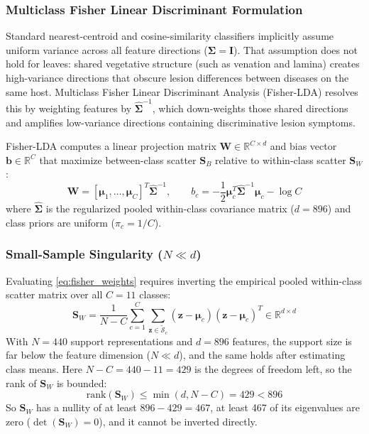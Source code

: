 \documentclass[preprint,12pt]{elsarticle}
\begin{document}
\subsubsection{Multiclass Fisher Linear Discriminant Formulation}
Standard nearest-centroid and cosine-similarity classifiers implicitly assume uniform variance across all feature directions ($\mathbf{\Sigma} = \mathbf{I}$). That assumption does not hold for leaves: shared vegetative structure (such as venation and lamina) creates high-variance directions that obscure lesion differences between diseases on the same host. Multiclass Fisher Linear Discriminant Analysis (Fisher-LDA) \cite{fisher1936use, rao1948utilization} resolves this by weighting features by $\hat{\mathbf{\Sigma}}^{-1}$, which down-weights those shared directions and amplifies low-variance directions containing discriminative lesion symptoms.

Fisher-LDA computes a linear projection matrix $\mathbf{W} \in \mathbb{R}^{C \times d}$ and bias vector $\mathbf{b} \in \mathbb{R}^C$ that maximize between-class scatter $\mathbf{S}_B$ relative to within-class scatter $\mathbf{S}_W$:
\begin{equation}
    \label{eq:fisher_weights}
    \mathbf{W} = [\boldsymbol{\mu}_1, \dots, \boldsymbol{\mu}_C]^T \hat{\mathbf{\Sigma}}^{-1}, \qquad
    b_c = -\frac{1}{2}\boldsymbol{\mu}_c^T \hat{\mathbf{\Sigma}}^{-1}\boldsymbol{\mu}_c - \log C
\end{equation}
where $\hat{\mathbf{\Sigma}}$ is the regularized pooled within-class covariance matrix ($d = 896$) and class priors are uniform ($\pi_c = 1/C$).

\subsubsection{Small-Sample Singularity ($N \ll d$)}
Evaluating \eqref{eq:fisher_weights} requires inverting the empirical pooled within-class scatter matrix over all $C = 11$ classes:
\begin{equation}
    \label{eq:within_class_scatter}
    \mathbf{S}_W = \frac{1}{N-C}\sum_{c=1}^C \sum_{\mathbf{z} \in \tilde{\mathcal{S}}_c} (\mathbf{z}-\boldsymbol{\mu}_c)(\mathbf{z}-\boldsymbol{\mu}_c)^T \in \mathbb{R}^{d \times d}
\end{equation}
With $N = 440$ support representations and $d = 896$ features, the support size is far below the feature dimension ($N \ll d$), and the same holds after estimating class means. Here $N - C = 440 - 11 = 429$ is the degrees of freedom left, so the rank of $\mathbf{S}_W$ is bounded:
\begin{equation}
    \label{eq:rank_bound}
    \text{rank}(\mathbf{S}_W) \le \min(d, N-C) = 429 < 896
\end{equation}
So $\mathbf{S}_W$ has a nullity of at least $896 - 429 = 467$, at least 467 of its eigenvalues are zero ($\det(\mathbf{S}_W) = 0$), and it cannot be inverted directly.
\end{document}
